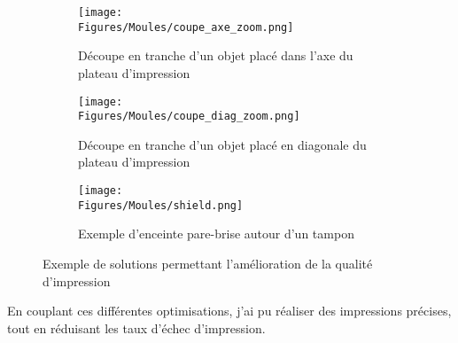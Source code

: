\documentclass[\main/main.tex]{subfiles}
\begin{document}
\begin{figure}[htbp]
    \centering
    \begin{subfigure}[b]{0.30\textwidth}
       \centering \caption{
            \label{fig:print:axe}
            Découpe en tranche d'un objet placé dans l'axe du plateau d'impression
            }
       \centering \texttt{[image: \\Figures/Moules/coupe\_axe\_zoom.png]}
    \end{subfigure}
    \begin{subfigure}[b]{0.30\textwidth}
       \centering \caption{
            \label{fig:print:diag}
            Découpe en tranche d'un objet placé en diagonale du plateau d'impression
            }
       \centering \texttt{[image: \\Figures/Moules/coupe\_diag\_zoom.png]}
    \end{subfigure}
    \begin{subfigure}[b]{0.30\textwidth}
       \centering \caption{
            \label{fig:print:shield}
            Exemple d'enceinte pare-brise autour d'un tampon
            }
       \centering \texttt{[image: \\Figures/Moules/shield.png]}
    \end{subfigure}
    \caption{
        \label{fig:print}
        Exemple de solutions permettant l'amélioration de la qualité d'impression
    }
\end{figure}

%
En couplant ces différentes optimisations, j'ai pu réaliser des impressions précises, tout en réduisant les taux d'échec d'impression.
\end{document}
